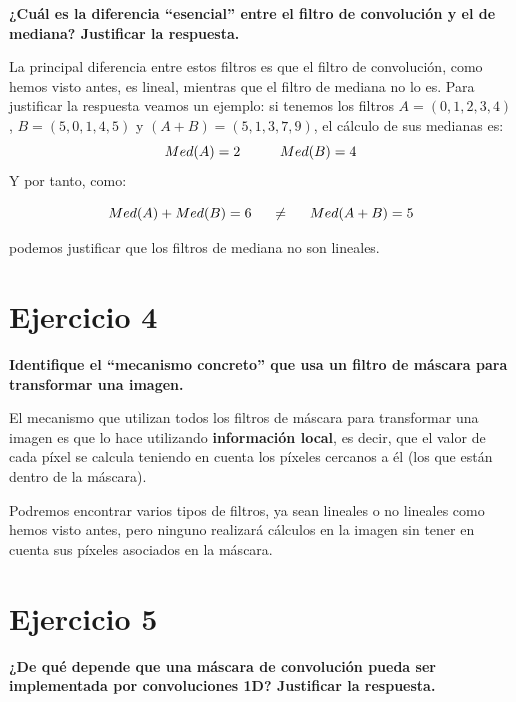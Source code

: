 \documentclass[11pt,a4paper]{article}
\begin{document}
\textbf{¿Cuál es la diferencia “esencial” entre el filtro de convolución y el de mediana? Justificar la respuesta.}

La principal diferencia entre estos filtros es que el filtro de convolución, como hemos visto antes, es lineal, mientras que el
filtro de mediana no lo es. Para justificar la respuesta veamos un ejemplo: si tenemos los filtros $A=(0,1,2,3,4)$, $B=(5,0,1,4,5)$
y $(A+B)=(5,1,3,7,9)$, el cálculo de sus medianas es:
\begin{equation}
Med(A) = 2 \hspace{10mm} Med(B) = 4
\end{equation}
Y por tanto, como:

\begin{equation}
Med(A)+Med(B)=6 \hspace{5mm} \neq \hspace{5mm} Med(A+B)=5
\end{equation}

podemos justificar que los filtros de mediana no son lineales.

\newpage


\section*{Ejercicio 4}

\textbf{Identifique el “mecanismo concreto” que usa un filtro de máscara para transformar una imagen.}

El mecanismo que utilizan todos los filtros de máscara para transformar una imagen es que lo hace utilizando \textbf{información local},
es decir, que el valor de cada píxel se calcula teniendo en cuenta los píxeles cercanos a él (los que están dentro de la máscara).

Podremos encontrar varios tipos de filtros, ya sean lineales o no lineales como hemos visto antes, pero ninguno realizará cálculos
en la imagen sin tener en cuenta sus píxeles asociados en la máscara.

\section*{Ejercicio 5}

\textbf{¿De qué depende que una máscara de convolución pueda ser implementada por convoluciones 1D? Justificar la respuesta.}
\end{document}

